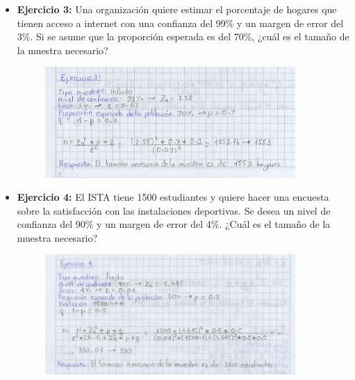 \documentclass[12pt]{article}
\begin{document}
\begin{itemize}
            \item \textbf{Ejercicio 3:} Una organización quiere estimar el porcentaje de hogares que tienen acceso a internet con una confianza del 99\% y un margen de error del 3\%. Si se asume que la proporción esperada es del 70\%, ¿cuál es el tamaño de la muestra necesario?
                \begin{figure}[!h]
                    \centering
                    \includegraphics[width=0.9\textwidth]{Img/Tarea1_ej3.jpeg}
                \end{figure}
            
            \item \textbf{Ejercicio 4:} El ISTA tiene 1500 estudiantes y quiere hacer una encuesta sobre la satisfacción con las instalaciones deportivas. Se desea un nivel de confianza del 90\% y un margen de error del 4\%. ¿Cuál es el tamaño de la muestra necesario?
                \begin{figure}[!h]
                    \centering
                    \includegraphics[width=0.9\textwidth]{Img/Tarea1_ej4.jpeg}
                \end{figure}
            

\end{itemize}
\end{document}
